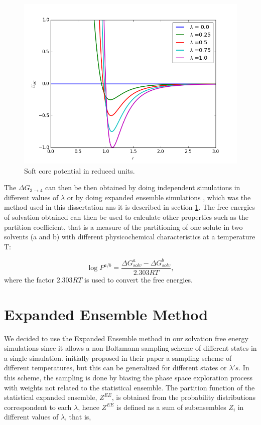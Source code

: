 	\begin{figure}[H]
		\centering
		\includegraphics[width=0.9\linewidth]{Figures/SC}
		\caption{Soft core potential in reduced units.}
		\label{fig:SC}
	\end{figure}
	
	The $\Delta G_{3 \rightarrow 4}$ can then be then obtained by doing independent simulations in different values of $\lambda$ or by doing expanded ensemble simulations \cite{lyubartsev}, which was the method used in this dissertation ans it is described in section \ref{ee}. The free energies of solvation obtained can then be used to calculate other properties such as the partition coefficient, that is a measure of the partitioning of one solute in two solvents (a and b) with different physicochemical characteristics  at a temperature T:
	
	\begin{equation}
	\label{eqn:partcoe}
	\log{P}^{a/b} = \frac{\Delta G_{solv}^{a} - \Delta G_{solv}^{b}}{2.303RT},
	\end{equation}
	where the factor $2.303RT$ is used to convert the free energies.
	
\section{Expanded Ensemble Method}\label{ee}
	
	We decided to use the Expanded Ensemble method \cite{lyubartsev} in our solvation free energy simulations since it allows a non-Boltzmann sampling scheme of different states in a single simulation.  initially proposed in their paper a sampling scheme of different temperatures, but this can be generalized for different states or $\lambda 's$. In this scheme, the sampling is done by biasing the phase space exploration process with weights not related to the statistical ensemble. The partition function of the statistical expanded ensemble, $Z^{EE}$, is obtained from the probability distributions correspondent to each $\lambda$, hence $Z^{EE}$ is defined as a sum of subensembles $Z_{i}$ in different values of $\lambda$, that is,
	
